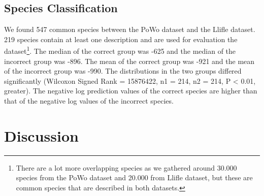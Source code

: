 \documentclass[a4paper, 12pt, oneside]{book} %
\begin{document}
\subsection{Species Classification}
We found 547 common species between the PoWo dataset and the Llifle dataset.
219 species contain at least one description and are used for evaluation the dataset\footnote{There are a lot more overlapping species as we gathered around 30.000 species from the PoWo dataset and 20.000 from Llifle dataset, but these are common species that are described in both datasets.}.
The median of the correct group was -625 and the median of the incorrect group was -896.
The mean of the correct group was -921 and the mean of the incorrect group was -990.
The distributions in the two groups differed significantly (Wilcoxon Signed Rank = 15876422, n1 = 214, n2 = 214, P < 0.01, greater).
The negative log prediction values of the correct species are higher than that of the negative log values of the incorrect species.

\newpage
\section{Discussion} \label{par:discussion}
\end{document}
